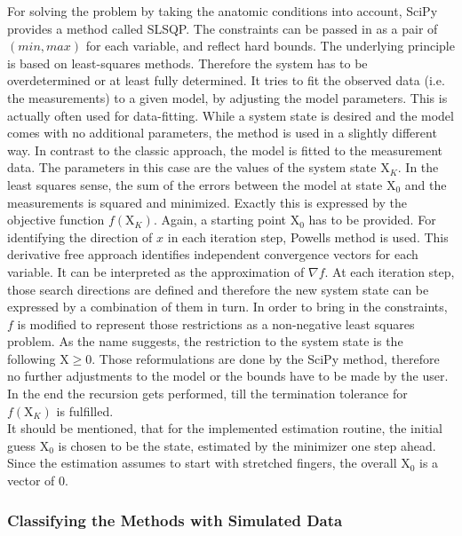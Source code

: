 For solving the problem by taking the anatomic conditions into account, SciPy provides a method called \ac{SLSQP}. The constraints can be passed in as a pair of $ (min,max) $ for each variable, and reflect hard bounds. The underlying principle is based on least-squares methods. Therefore the system has to be overdetermined or at least fully determined. It tries to fit the observed data (i.e. the measurements) to a given model, by adjusting the model parameters. This is actually often used for data-fitting. While a system state is desired and the model comes with no additional parameters, the method is used in a slightly different way. In contrast to the classic approach, the model is fitted to the measurement data. The parameters in this case are the values of the system state $ \mathrm{X}_K $. In the least squares sense, the sum of the errors between the model at state $ \mathrm{X}_{0} $ and the measurements is squared and minimized. Exactly this is expressed by the objective function $ f(\mathrm{X}_K) $. Again, a starting point $ \mathrm{X}_{0} $ has to be provided. For identifying the direction of $ x $ in each iteration step, Powells method \cite{powell1964efficient} is used. This derivative free approach identifies independent convergence vectors for each variable. It can be interpreted as the approximation of $ \nabla f $. At each iteration step, those search directions are defined and therefore the new system state can be expressed by a combination of them in turn. In order to bring in the constraints, $ f $ is modified to represent those restrictions as a non-negative least squares problem. As the name suggests, the restriction to the system state is the following $ \mathrm{X} \geq 0$. Those reformulations are done by the SciPy method, therefore no further adjustments to the model or the bounds have to be made by the user. In the end the recursion gets performed, till the termination tolerance for $ f(\mathrm{X}_K) $ is fulfilled.\\
It should be mentioned, that for the implemented estimation routine, the initial guess $ \mathrm{X}_{0} $ is chosen to be the state, estimated by the minimizer one step ahead. Since the estimation assumes to start with stretched fingers, the overall $ \mathrm{X}_{0} $ is a vector of 0.  


\subsubsection{Classifying the Methods with Simulated Data}

